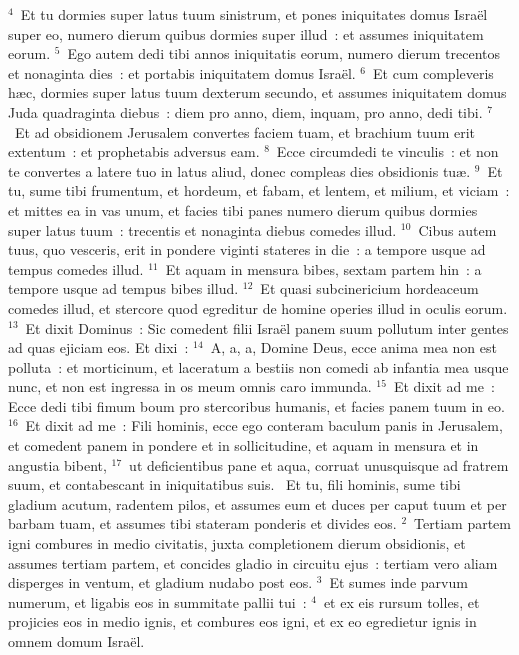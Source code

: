 ${}^{4}$~Et tu dormies super latus tuum sinistrum, et pones iniquitates domus Isra\"el super eo, numero dierum quibus dormies super illud~: et assumes iniquitatem eorum.
${}^{5}$~Ego autem dedi tibi annos iniquitatis eorum, numero dierum trecentos et nonaginta dies~: et portabis iniquitatem domus Isra\"el.
${}^{6}$~Et cum compleveris h\ae c, dormies super latus tuum dexterum secundo, et assumes iniquitatem domus Juda quadraginta diebus~: diem pro anno, diem, inquam, pro anno, dedi tibi.
${}^{7}$~Et ad obsidionem Jerusalem convertes faciem tuam, et brachium tuum erit extentum~: et prophetabis adversus eam.
${}^{8}$~Ecce circumdedi te vinculis~: et non te convertes a latere tuo in latus aliud, donec compleas dies obsidionis tu\ae .
${}^{9}$~Et tu, sume tibi frumentum, et hordeum, et fabam, et lentem, et milium, et viciam~: et mittes ea in vas unum, et facies tibi panes numero dierum quibus dormies super latus tuum~: trecentis et nonaginta diebus comedes illud.
${}^{10}$~Cibus autem tuus, quo vesceris, erit in pondere viginti stateres in die~: a tempore usque ad tempus comedes illud.
${}^{11}$~Et aquam in mensura bibes, sextam partem hin~: a tempore usque ad tempus bibes illud.
${}^{12}$~Et quasi subcinericium hordeaceum comedes illud, et stercore quod egreditur de homine operies illud in oculis eorum.
${}^{13}$~Et dixit Dominus~: Sic comedent filii Isra\"el panem suum pollutum inter gentes ad quas ejiciam eos. Et dixi~:
${}^{14}$~A, a, a, Domine Deus, ecce anima mea non est polluta~: et morticinum, et laceratum a bestiis non comedi ab infantia mea usque nunc, et non est ingressa in os meum omnis caro immunda.
${}^{15}$~Et dixit ad me~: Ecce dedi tibi fimum boum pro stercoribus humanis, et facies panem tuum in eo.
${}^{16}$~Et dixit ad me~: Fili hominis, ecce ego conteram baculum panis in Jerusalem, et comedent panem in pondere et in sollicitudine, et aquam in mensura et in angustia bibent,
${}^{17}$~ut deficientibus pane et aqua, corruat unusquisque ad fratrem suum, et contabescant in iniquitatibus suis.
~Et tu, fili hominis, sume tibi gladium acutum, radentem pilos, et assumes eum et duces per caput tuum et per barbam tuam, et assumes tibi stateram ponderis et divides eos.
${}^{2}$~Tertiam partem igni combures in medio civitatis, juxta completionem dierum obsidionis, et assumes tertiam partem, et concides gladio in circuitu ejus~: tertiam vero aliam disperges in ventum, et gladium nudabo post eos.
${}^{3}$~Et sumes inde parvum numerum, et ligabis eos in summitate pallii tui~:
${}^{4}$~et ex eis rursum tolles, et projicies eos in medio ignis, et combures eos igni, et ex eo egredietur ignis in omnem domum Isra\"el.


